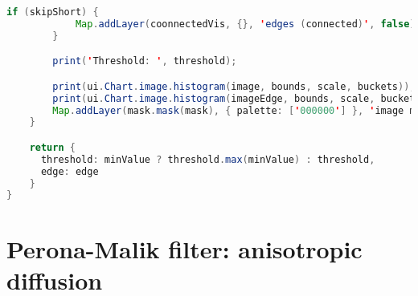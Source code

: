 \begin{lstlisting}[language=Java, basicstyle=\tiny]
        if (skipShort) {
            Map.addLayer(coonnectedVis, {}, 'edges (connected)', false);
        }

        print('Threshold: ', threshold);

        print(ui.Chart.image.histogram(image, bounds, scale, buckets));
        print(ui.Chart.image.histogram(imageEdge, bounds, scale, buckets));
        Map.addLayer(mask.mask(mask), { palette: ['000000'] }, 'image mask', false);
    }

    return {
      threshold: minValue ? threshold.max(minValue) : threshold,
      edge: edge
    }
}

\end{lstlisting}

\newpage

\section{Perona-Malik filter: anisotropic diffusion}
\label{listing:perona-malik}

